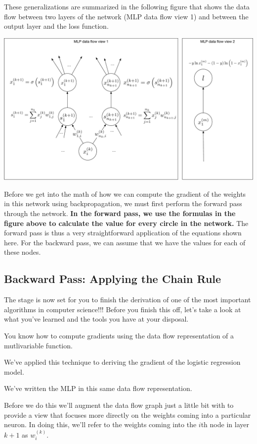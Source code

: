 \documentclass[assignment06_Solutions]{subfiles}
\begin{document}
These generalizations are summarized in the following figure that shows the data flow between two layers of the network (MLP data flow view 1) and between the output layer and the loss function.

\includegraphics[width=\linewidth]{figures/mlpfullforward}

Before we get into the math of how we can compute the gradient of the weights in this network using backpropagation, we must first perform the forward pass through the network.  \textbf{In the forward pass, we use the formulas in the figure above to calculate the value for every circle in the network.}  The forward pass is thus a very straightforward application of the equations shown here.  For the backward pass, we can assume that we have the values for each of these nodes.

\subsection{Backward Pass: Applying the Chain Rule}

The stage is now set for you to finish the derivation of one of the most important algorithms in computer science!!!  Before you finish this off, let's take a look at what you've learned and the tools you have at your disposal.
\be
\item You know how to compute gradients using the data flow representation of a mutlivariable function.
\item We've applied this technique to deriving the gradient of the logistic regression model.
\item We've written the MLP in this same data flow representation.
\ee

Before we do this we'll augment the data flow graph just a little bit with to provide a view that focuses more directly on the weights coming into a particular neuron.  In doing this, we'll refer to the weights coming into the $i$th node in layer $k+1$ as $w^{(k)}_i$.
\end{document}
